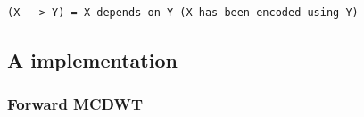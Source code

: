 {\begin{verbatim}
(X --> Y) = X depends on Y (X has been encoded using Y)
\end{verbatim}

\subsection{A implementation}
\subsubsection{Forward MCDWT}
\begin{Shaded}
\begin{Highlighting}[]
\OperatorTok{=}  
\OperatorTok{=}  


\end{Highlighting}
\end{Shaded}}
